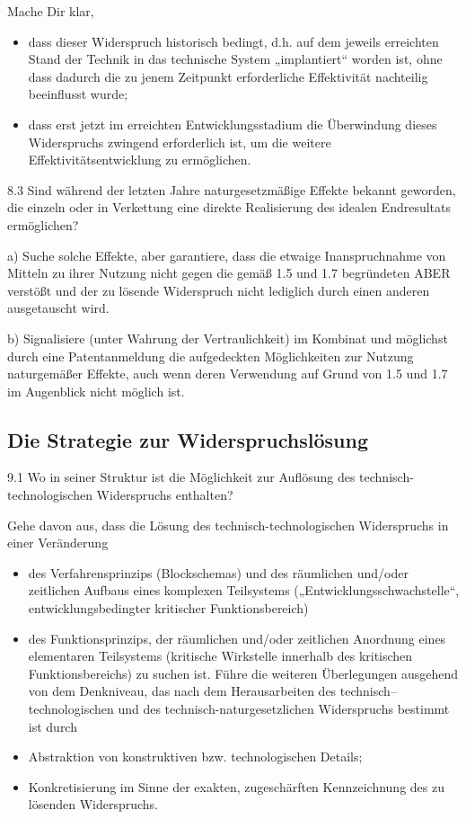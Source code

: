 \documentclass[12pt,a4paper]{article}
\begin{document}
Mache Dir klar,
\begin{itemize}
\item dass dieser Widerspruch historisch bedingt, d.h. auf dem jeweils
  erreichten Stand der Technik in das technische System „implantiert“ worden
  ist, ohne dass dadurch die zu jenem Zeitpunkt erforderliche Effektivität
  nachteilig beeinflusst wurde; 
\item dass erst jetzt im erreichten Entwicklungsstadium die Überwindung dieses
  Widerspruchs zwingend erforderlich ist, um die weitere
  Effektivitätsentwicklung zu ermöglichen.
\end{itemize}

8.3 Sind während der letzten Jahre naturgesetzmäßige Effekte bekannt geworden,
die einzeln oder in Verkettung eine direkte Realisierung des idealen
Endresultats ermöglichen?

a) Suche solche Effekte, aber garantiere, dass die etwaige Inanspruchnahme von
Mitteln zu ihrer Nutzung nicht gegen die gemäß 1.5 und 1.7 begründeten ABER
verstößt und der zu lösende Widerspruch nicht lediglich durch einen anderen
ausgetauscht wird.

b) Signalisiere (unter Wahrung der Vertraulichkeit) im Kombinat und möglichst
durch eine Patentanmeldung die aufgedeckten Möglichkeiten zur Nutzung
naturgemäßer Effekte, auch wenn deren Verwendung auf Grund von 1.5 und 1.7 im
Augenblick nicht möglich ist.

\subsection{Die Strategie zur Widerspruchslösung}

9.1 Wo in seiner Struktur ist die Möglichkeit zur Auflösung des
technisch-technologischen Widerspruchs enthalten?

Gehe davon aus, dass die Lösung des technisch-technologischen Widerspruchs in einer Veränderung
\begin{itemize}
  \item des Verfahrensprinzips (Blockschemas) und des räumlichen und/oder
    zeitlichen Aufbaus eines komplexen Teilsystems
    („Entwicklungsschwachstelle“, entwicklungsbedingter kritischer
    Funktionsbereich)
  \item des Funktionsprinzips, der räumlichen und/oder zeitlichen Anordnung
    eines elementaren Teilsystems (kritische Wirkstelle innerhalb des
    kritischen Funktionsbereichs) zu suchen ist. Führe die weiteren
    Überlegungen ausgehend von dem Denkniveau, das nach dem Herausarbeiten des
    technisch–technologischen und des technisch-naturgesetzlichen Widerspruchs
    bestimmt ist durch
  \item Abstraktion von konstruktiven bzw. technologischen Details;
  \item Konkretisierung im Sinne der exakten, zugeschärften Kennzeichnung des
    zu lösenden Widerspruchs.
\end{itemize}
\end{document}
